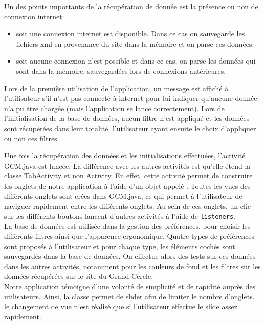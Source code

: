 \documentclass[a4paper, 11px]{article}
\begin{document}
\vspace{0.5cm}
\noindent Un des points importants de la récupération de donnée est la présence ou non de connexion internet: 
\begin{itemize}
\item soit une connexion internet est disponible. Dans ce cas on sauvegarde les fichiers xml en provenance du site dans la mémoire et on parse ces données.\\
\item soit aucune connexion n'est possible et dans ce cas, on parse les données qui sont dans la mémoire, sauvegardées lors de connexions antérieures.\\
\end{itemize}

\noindent Lors de la première utilisation de l'application, un message est affiché à l'utilisateur s'il n'est pas connecté à internet pour lui indiquer qu'aucune donnée n'a pu être chargée (mais l'application se lance correctement).
 Lors de l'initialisation de la base de données, aucun filtre n'est appliqué et les données sont récupérées dans leur totalité, l'utilisateur ayant ensuite le choix d'appliquer ou non ces filtres.

Une fois la récupération des données et les initialisations effectuées, l'activité GCM.java est lancée. La différence avec les autres activités est qu'elle étend la classe TabActivity et non Activity. En effet, cette activité permet de construire les onglets de notre application à l'aide d'un objet appelé . Toutes les vues des différents onglets sont crées dans GCM.java, ce qui permet à l'utilisateur de naviguer rapidement entre les différents onglets.
Au sein de ces onglets, un clic sur les différents boutons lancent d'autres activités à l'aide de \texttt{listeners}.\\

La base de données est utilisée dans la gestion des préférences, pour choisir les différents filtres ainsi que l'apparence ergonomique. Quatre types de préférences sont proposés à l'utilisateur et pour chaque type, les éléments cochés sont sauvegardés dans la base de données. On effectue alors des tests sur ces données dans les autres activités, notamment pour les couleurs de fond et les filtres sur les données récupérées sur le site du Grand Cercle.\\

Notre application témoigne d'une volonté de simplicité et de rapidité auprès des utilisateurs. Ainsi, la classe  permet de \og slider \fg afin de limiter le nombre d'onglets. le changement de vue n'est réalisé que si l'utilisateur effectue le slide assez rapidement.
\end{document}
